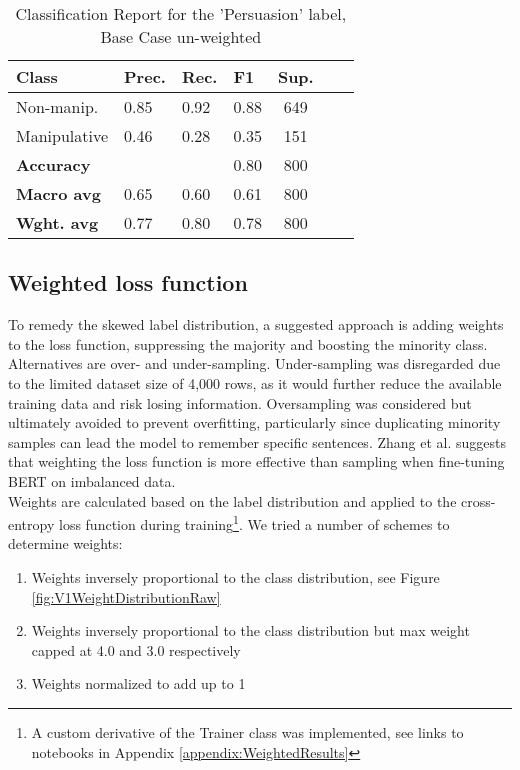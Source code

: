 \documentclass[
	letterpaper, %
	12pt, %
	unnumberedsections, %
	twoside, %
]{LTJournalArticle}
\begin{document}
\begin{table}[h!]
	\small
	\centering
	\begin{tabular}{|p{2.2cm}|p{1cm}|p{1cm}|p{1cm}|c|c|c|}
		\hline
		\textbf{Class}     & \textbf{Prec.} & \textbf{Rec.} & \textbf{F1} & \textbf{Sup.} \\
		\hline
		Non-manip.         & 0.85           & 0.92          & 0.88        & 649           \\
		\hline
		Manipulative       & 0.46           & 0.28          & 0.35        & 151           \\
		\hline
		\hline
		\textbf{Accuracy}  &                &               & 0.80        & 800           \\
		\hline
		\textbf{Macro avg} & 0.65           & 0.60          & 0.61        & 800           \\
		\hline
		\textbf{Wght. avg} & 0.77           & 0.80          & 0.78        & 800           \\
		\hline
	\end{tabular}
	\caption{Classification Report for the 'Persuasion' label, Base Case un-weighted}
	\label{tab:BaseCasePersuasionReport}
\end{table}

\subsection{Weighted loss function}

To remedy the skewed label distribution, a suggested approach is adding weights to the loss function, suppressing the majority and boosting the minority class. Alternatives are over- and under-sampling. Under-sampling was disregarded due to the limited dataset size of 4,000 rows, as it would further reduce the available training data and risk losing information. Oversampling was considered but ultimately avoided to prevent overfitting, particularly since duplicating minority samples can lead the model to remember specific sentences. Zhang et al. \cite{zhang2020revisiting} suggests that weighting the loss function is more effective than sampling when fine-tuning BERT on imbalanced data. \\

Weights are calculated based on the label distribution and applied to the cross-entropy loss function during training\footnote{A custom derivative of the Trainer class was implemented, see links to notebooks in Appendix \ref{appendix:WeightedResults}}. We tried a number of schemes to determine weights:
\begin{enumerate}
	\item Weights inversely proportional to the class distribution, see Figure \ref{fig:V1WeightDistributionRaw}
	\item Weights inversely proportional to the class distribution but max weight capped at 4.0 and 3.0 respectively
	\item Weights normalized to add up to 1
\end{enumerate}
\end{document}
